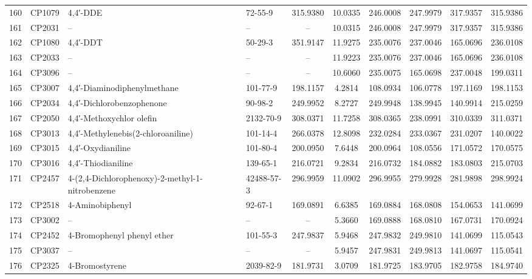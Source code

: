 \begin{longtable}{clllcccccc}
160 & CP1079 & 4,4′-DDE & 72-55-9 & 315.9380 & 10.0335 & 246.0008 & 247.9979 & 317.9357 & 315.9386 \\ 
161 & CP2031 & – & – & – & 10.0315 & 246.0008 & 247.9979 & 317.9357 & 315.9386 \\ 
162 & CP1080 & 4,4′-DDT & 50-29-3 & 351.9147 & 11.9275 & 235.0076 & 237.0046 & 165.0696 & 236.0108 \\ 
163 & CP2033 & – & – & – & 11.9223 & 235.0076 & 237.0046 & 165.0696 & 236.0108 \\ 
164 & CP3096 & – & – & – & 10.6060 & 235.0075 & 165.0698 & 237.0048 & 199.0311 \\ 
165 & CP3007 & 4,4′-Diaminodiphenylmethane\smash{\textsuperscript{\textdaggerdbl}} & 101-77-9 & 198.1157 & 4.2814 & 108.0934 & 106.0778 & 197.1169 & 198.1153 \\ 
166 & CP2034 & 4,4′-Dichlorobenzophenone & 90-98-2 & 249.9952 & 8.2727 & 249.9948 & 138.9945 & 140.9914 & 215.0259 \\ 
167 & CP2050 & 4,4′-Methoxychlor olefin & 2132-70-9 & 308.0371 & 11.7258 & 308.0365 & 238.0991 & 310.0339 & 311.0371 \\ 
168 & CP3013 & 4,4′-Methylenebis(2-chloroaniline)\smash{\textsuperscript{\textdaggerdbl}} & 101-14-4 & 266.0378 & 12.8098 & 232.0284 & 233.0367 & 231.0207 & 140.0022 \\ 
169 & CP3015 & 4,4′-Oxydianiline\smash{\textsuperscript{\textdaggerdbl}} & 101-80-4 & 200.0950 & 7.6448 & 200.0964 & 108.0556 & 171.0572 & 170.0575 \\ 
170 & CP3016 & 4,4′-Thiodianiline\smash{\textsuperscript{\textdaggerdbl}} & 139-65-1 & 216.0721 & 9.2834 & 216.0732 & 184.0882 & 183.0803 & 215.0703 \\ 
171 & CP2457 & 4-(2,4-Dichlorophenoxy)-2-methyl-1-nitrobenzene & 42488-57-3 & 296.9959 & 11.0902 & 296.9955 & 279.9928 & 281.9898 & 298.9924 \\ 
172 & CP2518 & 4-Aminobiphenyl\smash{\textsuperscript{\textdaggerdbl}} & 92-67-1 & 169.0891 & 6.6385 & 169.0884 & 168.0808 & 154.0653 & 141.0699 \\ 
173 & CP3002 & – & – & – & 5.3660 & 169.0888 & 168.0810 & 167.0731 & 170.0924 \\ 
174 & CP2452 & 4-Bromophenyl phenyl ether & 101-55-3 & 247.9837 & 5.9468 & 247.9832 & 249.9810 & 141.0699 & 115.0543 \\ 
175 & CP3037 & – & – & – & 5.9457 & 247.9831 & 249.9813 & 141.0697 & 115.0541 \\ 
176 & CP2325 & 4-Bromostyrene & 2039-82-9 & 181.9731 & 3.0709 & 181.9725 & 183.9705 & 182.9758 & 184.9740 \\ 

\end{longtable}
